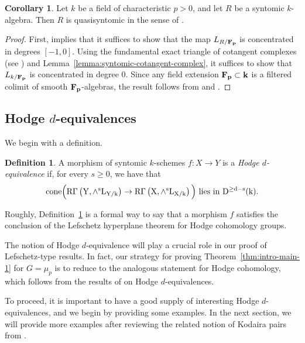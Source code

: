 \documentclass[11pt,reqno]{amsart}
\numberwithin{equation}{section}
\theoremstyle{definition}
\newtheorem{defn}[thm]{Definition}
\newtheorem{cor}[thm]{Corollary}
\begin{document}
\begin{cor}\label{cor:syntomic-quasi-syntomic} Let $k$ be a field of characteristic $p>0$, and let $R$ be a syntomic $k$-algebra. Then $R$ is quasisyntomic in the sense of \cite[Def.~C.6 and Ex.~C.11]{Bhatt-Lurie}.
\end{cor}
\begin{proof}
 First, \cite[Ex.~C.11]{Bhatt-Lurie} implies that it suffices to show that the map $L_{R/\bf{F}_p}$ is concentrated in degrees $[-1, 0]$. Using the fundamental exact triangle of cotangent complexes (see \cite[\href{https://stacks.math.columbia.edu/tag/08QX}{Tag 08QX}]{stacks-project}) and Lemma~\ref{lemma:syntomic-cotangent-complex}, it suffices to show that $L_{k/\bf{F}_p}$ is concentrated in degree $0$. Since any field extension $\bf{F}_p\subset k$ is a filtered colimit of smooth $\bf{F}_p$-algebras, the result follows from \cite[\href{https://stacks.math.columbia.edu/tag/08R5}{Tag 08R5}]{stacks-project} and \cite[\href{https://stacks.math.columbia.edu/tag/08S9}{Tag 08S9}]{stacks-project}.
\end{proof}




\subsection{Hodge $d$-equivalences}

We begin with a definition. 

\begin{defn}\label{defn:hodge-d-equivalence}\cite[Def.~5.1]{ABM} A morphism of syntomic $k$-schemes $f\colon X \to Y$ is a {\it Hodge $d$-equivalence} if, for every $s\geq 0$, we have that
\[
\rm{cone}\Big( \rm{R}\Gamma\left(Y, \wedge^s L_{Y/k}\right) \to \rm{R}\Gamma\left(X, \wedge^s L_{X/k}\right)\Big) \text{ lies in } D^{\geq d-s}(k).
\]
\end{defn}

Roughly, Definition~\ref{defn:hodge-d-equivalence} is a formal way to say that a morphism $f$ satisfies the conclusion of the Lefschetz hyperplane theorem for Hodge cohomology groups.\smallskip

The notion of Hodge $d$-equivalence will play a crucial role in our proof of Lefschetz-type results. In fact, our strategy for proving Theorem~\ref{thm:intro-main-1} for $G = \mu_p$ is to reduce to the analogous statement for Hodge cohomology, which follows from the results of \cite{ABM} on Hodge $d$-equivalences. \smallskip

To proceed, it is important to have a good supply of interesting Hodge $d$-equivalences, and we begin by providing some examples. In the next section, we will provide more examples after reviewing the related notion of Kodaira pairs from \cite{ABM}. 
\end{document}
